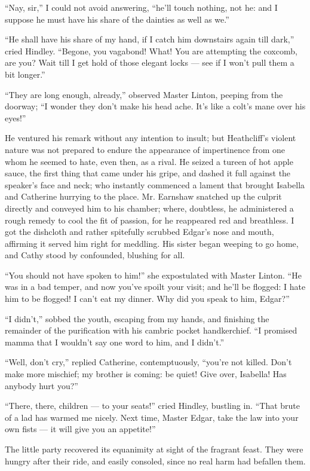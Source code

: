 \par “Nay, sir,” I could not avoid answering, “he'll touch nothing, not he: and I suppose he must have his share of the dainties as well as we.”
\par “He shall have his share of my hand, if I catch him downstairs again till dark,” cried Hindley. “Begone, you vagabond! What! You are attempting the coxcomb, are you? Wait till I get hold of those elegant locks — see if I won't pull them a bit longer.”
\par “They are long enough, already,” observed Master Linton, peeping from the doorway; “I wonder they don't make his head ache. It's like a colt's mane over his eyes!”
\par He ventured his remark without any intention to insult; but Heathcliff's violent nature was not prepared to endure the appearance of impertinence from one whom he seemed to hate, even then, as a rival. He seized a tureen of hot apple sauce, the first thing that came under his gripe, and dashed it full against the speaker's face and neck; who instantly commenced a lament that brought Isabella and Catherine hurrying to the place. Mr. Earnshaw snatched up the culprit directly and conveyed him to his chamber; where, doubtless, he administered a rough remedy to cool the fit of passion, for he reappeared red and breathless. I got the dishcloth and rather spitefully scrubbed Edgar's nose and mouth, affirming it served him right for meddling. His sister began weeping to go home, and Cathy stood by confounded, blushing for all.
\par “You should not have spoken to him!” she expostulated with Master Linton. “He was in a bad temper, and now you've spoilt your visit; and he'll be flogged: I hate him to be flogged! I can't eat my dinner. Why did you speak to him, Edgar?”
\par “I didn't,” sobbed the youth, escaping from my hands, and finishing the remainder of the purification with his cambric pocket handkerchief. “I promised mamma that I wouldn't say one word to him, and I didn't.”
\par “Well, don't cry,” replied Catherine, contemptuously, “you're not killed. Don't make more mischief; my brother is coming: be quiet! Give over, Isabella! Has anybody hurt you?”
\par “There, there, children — to your seats!” cried Hindley, bustling in. “That brute of a lad has warmed me nicely. Next time, Master Edgar, take the law into your own fists — it will give you an appetite!”
\par The little party recovered its equanimity at sight of the fragrant feast. They were hungry after their ride, and easily consoled, since no real harm had befallen them.
